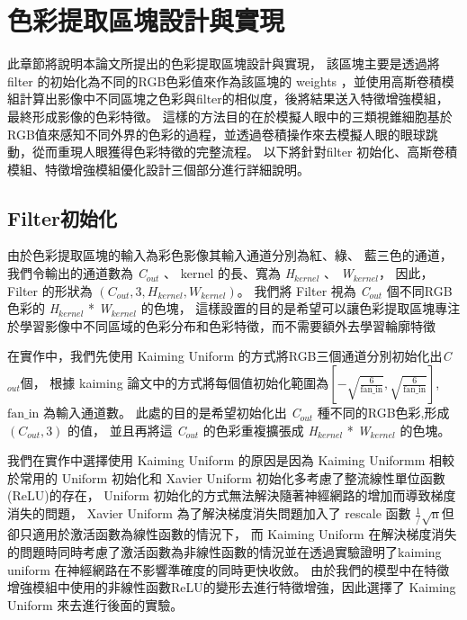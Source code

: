 \documentclass[class=NCU_thesis, crop=false]{standalone}
\begin{document}
\pagebreak

\section{色彩提取區塊設計與實現}

此章節將說明本論文所提出的色彩提取區塊設計與實現，
該區塊主要是透過將 filter 的初始化為不同的RGB色彩值來作為該區塊的 weights ，並使用高斯卷積模組計算出影像中不同區塊之色彩與filter的相似度，後將結果送入特徵增強模組，最終形成影像的色彩特徵。
這樣的方法目的在於模擬人眼中的三類視錐細胞基於RGB值來感知不同外界的色彩的過程，並透過卷積操作來去模擬人眼的眼球跳動，從而重現人眼獲得色彩特徵的完整流程。
以下將針對filter 初始化、高斯卷積模組、特徵增強模組優化設計三個部分進行詳細說明。

	\subsection{Filter初始化}

	由於色彩提取區塊的輸入為彩色影像其輸入通道分別為紅、綠、 藍三色的通道，
	我們令輸出的通道數為 \textit{C}$_{out}$ 、 kernel 的長、寬為 \textit{H}$_{kernel}$ 、 \textit{W}$_{kernel}$，
	因此， Filter 的形狀為 $\left(C_{out} , 3, H_{kernel}, W_{kernel}\right)$。
	我們將 Filter 視為 \textit{C}$_{out}$ 個不同RGB色彩的 \textit{H}$_{kernel}$ * \textit{W}$_{kernel}$ 的色塊，
	這樣設置的目的是希望可以讓色彩提取區塊專注於學習影像中不同區域的色彩分布和色彩特徵，而不需要額外去學習輪廓特徵

	在實作中，我們先使用 Kaiming Uniform 的方式將RGB三個通道分別初始化出\textit{C}$_{out}$個，
	根據 kaiming 論文\cite{DBLP:journals/corr/HeZR015}中的方式將每個值初始化範圍為$[-\sqrt{\frac{6}{\text{fan\_in}}}, \sqrt{\frac{6}{\text{fan\_in}}}]$,
	$\text{fan\_in}$ 為輸入通道數。
	此處的目的是希望初始化出 \textit{C}$_{out}$ 種不同的RGB色彩,形成 $\left(C_{out} , 3\right)$ 的值，
	並且再將這 \textit{C}$_{out}$ 的色彩重複擴張成 \textit{H}$_{kernel}$ * \textit{W}$_{kernel}$ 的色塊。

	我們在實作中選擇使用 Kaiming Uniform 的原因是因為 Kaiming Uniformm 相較於常用的 Uniform 初始化和 Xavier Uniform\cite{pmlr-v9-glorot10a} 初始化多考慮了整流線性單位函數(ReLU)的存在，
	Uniform 初始化的方式無法解決隨著神經網路的增加而導致梯度消失的問題，
	Xavier Uniform 為了解決梯度消失問題加入了 rescale 函數 $\frac{1} / \sqrt{\text{n}}$但卻只適用於激活函數為線性函數的情況下，
	而 Kaiming Uniform 在解決梯度消失的問題時同時考慮了激活函數為非線性函數的情況並在\cite{DBLP:journals/corr/HeZR015}透過實驗證明了kaiming uniform 在神經網路在不影響準確度的同時更快收斂。
	由於我們的模型中在特徵增強模組中使用的非線性函數ReLU的變形去進行特徵增強，因此選擇了 Kaiming Uniform 來去進行後面的實驗。
\end{document}
